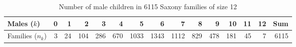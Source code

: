 \begin{table}[ht]
\caption{Number of male children in 6115 Saxony families of size 12} \label{tab:saxtab}
\centering
\begin{tabular}{l|rrrrrrrrrrrrrr}
  \hline
Males ($k$) & 0 & 1 & 2 & 3 & 4 & 5 & 6 & 7 & 8 & 9 & 10 & 11 & 12 & Sum \\ 
  \hline
Families ($n_k$) & 3 & 24 & 104 & 286 & 670 & 1033 & 1343 & 1112 & 829 & 478 & 181 & 45 & 7 & 6115 \\ 
   \hline
\end{tabular}
\end{table}
 
